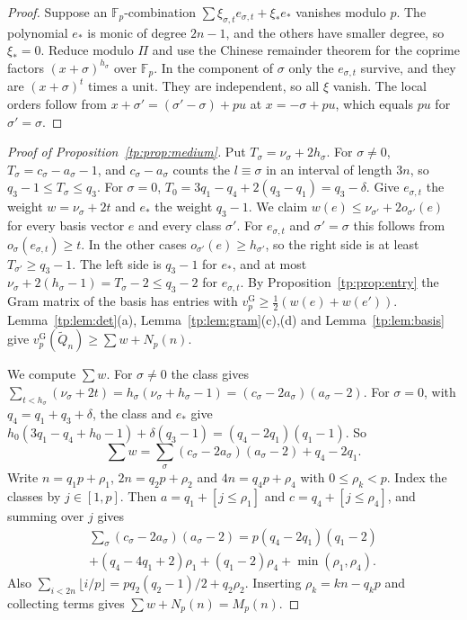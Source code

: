 \documentclass[11pt]{amsart}
\theoremstyle{definition}
\theoremstyle{remark}
\numberwithin{equation}{section}
\newcommand{\F}{\mathbb F}
\newcommand{\vG}{v_p^{\mathrm G}}
\begin{document}
\begin{proof}
Suppose an $\F_p$-combination $\sum\xi_{\sigma,t}e_{\sigma,t}+\xi_*e_*$ vanishes modulo $p$. The polynomial $e_*$ is monic
of degree $2n-1$, and the others have smaller degree, so $\xi_*=0$. Reduce modulo $\Pi$ and use the Chinese remainder
theorem for the coprime factors $(x+\sigma)^{h_\sigma}$ over $\F_p$. In the component of $\sigma$ only the
$e_{\sigma,t}$ survive, and they are $(x+\sigma)^t$ times a unit. They are independent, so all $\xi$ vanish. The local
orders follow from $x+\sigma'=(\sigma'-\sigma)+pu$ at $x=-\sigma+pu$, which equals $pu$ for $\sigma'=\sigma$.
\end{proof}

\begin{proof}[Proof of Proposition~\ref{tp:prop:medium}]
Put $T_\sigma=\nu_\sigma+2h_\sigma$. For $\sigma\ne0$, $T_\sigma=c_\sigma-a_\sigma-1$, and $c_\sigma-a_\sigma$ counts
the $l\equiv\sigma$ in an interval of length $3n$, so $q_3-1\le T_\sigma\le q_3$. For $\sigma=0$,
$T_0=3q_1-q_4+2(q_3-q_1)=q_3-\delta$. Give $e_{\sigma,t}$ the weight $w=\nu_\sigma+2t$ and $e_*$ the weight $q_3-1$.
We claim $w(e)\le\nu_{\sigma'}+2o_{\sigma'}(e)$ for every basis vector $e$ and every class $\sigma'$. For $e_{\sigma,t}$
and $\sigma'=\sigma$ this follows from $o_\sigma(e_{\sigma,t})\ge t$. In the other cases
$o_{\sigma'}(e)\ge h_{\sigma'}$, so the right side is at least $T_{\sigma'}\ge q_3-1$. The left side is $q_3-1$ for
$e_*$, and at most $\nu_\sigma+2(h_\sigma-1)=T_\sigma-2\le q_3-2$ for $e_{\sigma,t}$. By Proposition~\ref{tp:prop:entry} the Gram matrix of the
basis has entries with $\vG\ge\frac12(w(e)+w(e'))$. Lemma~\ref{tp:lem:det}(a), Lemma~\ref{tp:lem:gram}(c),(d) and
Lemma~\ref{tp:lem:basis} give $\vG(\tilde Q_n)\ge\sum w+N_p(n)$.

We compute $\sum w$. For $\sigma\ne0$ the class gives
$\sum_{t<h_\sigma}(\nu_\sigma+2t)=h_\sigma(\nu_\sigma+h_\sigma-1)=(c_\sigma-2a_\sigma)(a_\sigma-2)$. For $\sigma=0$, with
$q_4=q_1+q_3+\delta$, the class and $e_*$ give $h_0(3q_1-q_4+h_0-1)+\delta(q_3-1)=(q_4-2q_1)(q_1-1)$. So
\[
 \sum w=\sum_{\sigma}(c_\sigma-2a_\sigma)(a_\sigma-2)+q_4-2q_1 .
\]
Write $n=q_1p+\rho_1$, $2n=q_2p+\rho_2$ and $4n=q_4p+\rho_4$ with $0\le\rho_k<p$. Index the classes by
$j\in[1,p]$. Then $a=q_1+[j\le\rho_1]$ and $c=q_4+[j\le\rho_4]$, and summing over $j$ gives
\begin{multline*}
 \sum_\sigma(c_\sigma-2a_\sigma)(a_\sigma-2)=p(q_4-2q_1)(q_1-2)\\
 +(q_4-4q_1+2)\rho_1+(q_1-2)\rho_4+\min(\rho_1,\rho_4).
\end{multline*}
Also $\sum_{i<2n}\lfloor i/p\rfloor=pq_2(q_2-1)/2+q_2\rho_2$. Inserting $\rho_k=kn-q_kp$ and collecting terms gives
$\sum w+N_p(n)=M_p(n)$.
\end{proof}
\end{document}
